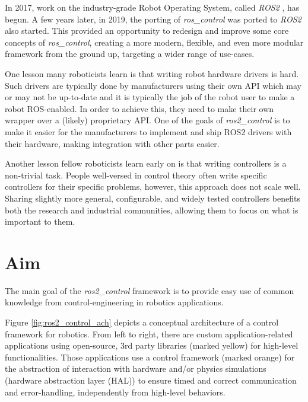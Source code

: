 \documentclass[journal]{IEEEtran}
\newcommand{\comment}[1]{}
\begin{document}
In 2017, work on the industry-grade Robot Operating System, called \emph{ROS2} \cite{ref_ros2}, has begun. A few years later, in 2019, the porting of \emph{ros\_control} was ported to \emph{ROS2} also started. This provided an opportunity to redesign and improve some core concepts of \emph{ros\_control}, creating a more modern, flexible, and even more modular framework from the ground up, targeting a wider range of use-cases.


One lesson many roboticists learn is that writing robot hardware drivers is hard. Such drivers are typically done by manufacturers using their own API which may or may not be up-to-date and it is typically the job of the robot user to make a robot ROS-enabled. In order to achieve this, they need to make their own wrapper over a (likely) proprietary API. One of the goals of \emph{ros2\_control} is to make it easier for the manufacturers to implement and ship ROS2 drivers with their hardware, making integration with other parts easier.

Another lesson fellow roboticists learn early on is that writing controllers is a non-trivial task.
People well-versed in control theory often write specific controllers for their specific problems, however, this approach does not scale well.
Sharing slightly more general, configurable, and widely tested controllers benefits both the research and industrial communities, allowing them to focus on what is important to them.
\comment{The more a controller is used, the quicker achieves maturity, helping robots be safe and reliable in harsh deployment environments or places where they need to interact with humans.}

\section{Aim}
\label{sec:aim}
The main goal of the \emph{ros2\_control} framework is to provide easy use of common knowledge from control-engineering in robotics applications.

Figure \ref{fig:ros2_control_ach} depicts a conceptual architecture of a control framework for robotics. From left to right, there are custom application-related applications using open-source, 3rd party libraries (marked yellow) for high-level functionalities.
Those applications use a control framework (marked orange) for the abstraction of interaction with hardware and/or physics simulations (hardware abstraction layer (HAL)) to ensure timed and correct communication and error-handling, independently from high-level behaviors.
\end{document}
